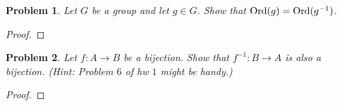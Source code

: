 \documentclass[reqno]{amsart}
\theoremstyle{plain}
\newtheorem{problem}{Problem}
\theoremstyle{definition}
\begin{document}
\begin{problem}
Let $G$ be a group and let $g \in G$.  Show that ${\rm Ord}(g) = {\rm Ord}(g^{-1})$.
\end{problem}
\begin{proof}

\end{proof}



\begin{problem}
Let $f:A \longrightarrow B$ be a bijection.  Show that $f^{-1}:B \longrightarrow A$ is also a bijection.  (Hint:  Problem $6$ of hw $1$ might be handy.)
\end{problem}
\begin{proof}

\end{proof}
\end{document}
